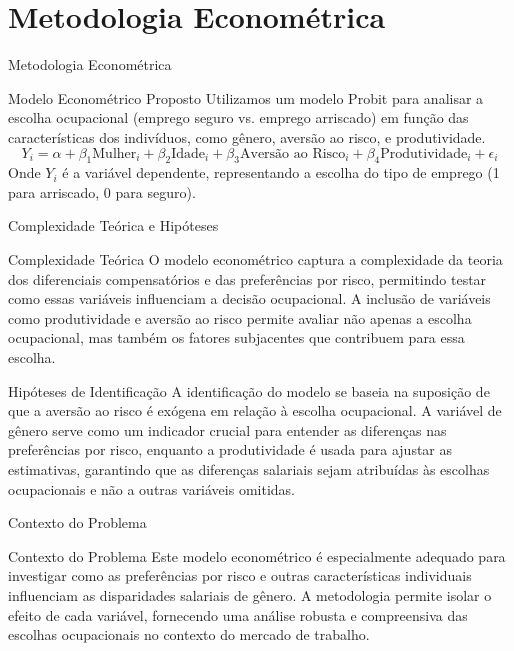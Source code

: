 \documentclass[aspectratio=169, xcolor={dvipsnames}, 10pt, brazil]{beamer}
\begin{document}
\section{Metodologia Econométrica}
\begin{frame}{Metodologia Econométrica}
    \begin{block}{Modelo Econométrico Proposto}
        Utilizamos um modelo Probit para analisar a escolha ocupacional (emprego seguro vs. emprego arriscado) em função das características dos indivíduos, como gênero, aversão ao risco, e produtividade.
        \[
        Y_i = \alpha + \beta_1 \text{Mulher}_i + \beta_2 \text{Idade}_i + \beta_3 \text{Aversão ao Risco}_i + \beta_4 \text{Produtividade}_i + \epsilon_i
        \]
        Onde \( Y_i \) é a variável dependente, representando a escolha do tipo de emprego (1 para arriscado, 0 para seguro).
    \end{block}
\end{frame}

\begin{frame}{Complexidade Teórica e Hipóteses}
    \begin{block}{Complexidade Teórica}
        O modelo econométrico captura a complexidade da teoria dos diferenciais compensatórios e das preferências por risco, permitindo testar como essas variáveis influenciam a decisão ocupacional. A inclusão de variáveis como produtividade e aversão ao risco permite avaliar não apenas a escolha ocupacional, mas também os fatores subjacentes que contribuem para essa escolha.
    \end{block}
    
    \vspace{0.5cm}
    
    \begin{block}{Hipóteses de Identificação}
        A identificação do modelo se baseia na suposição de que a aversão ao risco é exógena em relação à escolha ocupacional. A variável de gênero serve como um indicador crucial para entender as diferenças nas preferências por risco, enquanto a produtividade é usada para ajustar as estimativas, garantindo que as diferenças salariais sejam atribuídas às escolhas ocupacionais e não a outras variáveis omitidas.
    \end{block}
\end{frame}

\begin{frame}{Contexto do Problema}
    \begin{block}{Contexto do Problema}
        Este modelo econométrico é especialmente adequado para investigar como as preferências por risco e outras características individuais influenciam as disparidades salariais de gênero. A metodologia permite isolar o efeito de cada variável, fornecendo uma análise robusta e compreensiva das escolhas ocupacionais no contexto do mercado de trabalho.
    \end{block}
\end{frame}
\end{document}
